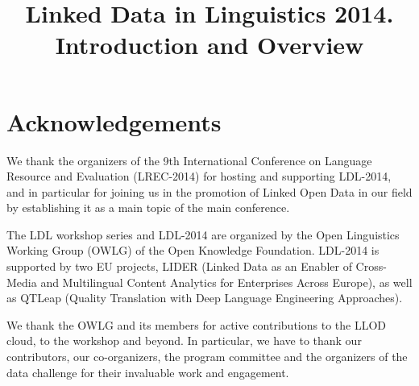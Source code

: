 \documentclass[10pt, a4paper]{article}
\title{Linked Data in Linguistics 2014. Introduction and Overview}
\begin{document}
\maketitleabstract





\section*{Acknowledgements}

We thank the organizers of the 9th International Conference on Language Resource and Evaluation (LREC-2014) for hosting and supporting LDL-2014, and in particular for joining us in the promotion of Linked Open Data in our field by establishing it as a main topic of the main conference.

The LDL workshop series and LDL-2014 are organized by the Open Linguistics Working Group (OWLG) of the Open Knowledge Foundation. LDL-2014 is supported by two EU projects, LIDER (Linked Data as an Enabler of Cross-Media and Multilingual Content Analytics for Enterprises Across Europe), as well as QTLeap (Quality Translation with Deep Language Engineering Approaches).

We thank the OWLG and its members for active contributions to the LLOD cloud, to the workshop and beyond. In particular, we have to thank our contributors, our co-organizers, the program  committee and the organizers of the data challenge for their invaluable work and engagement.




\newpage
\end{document}
